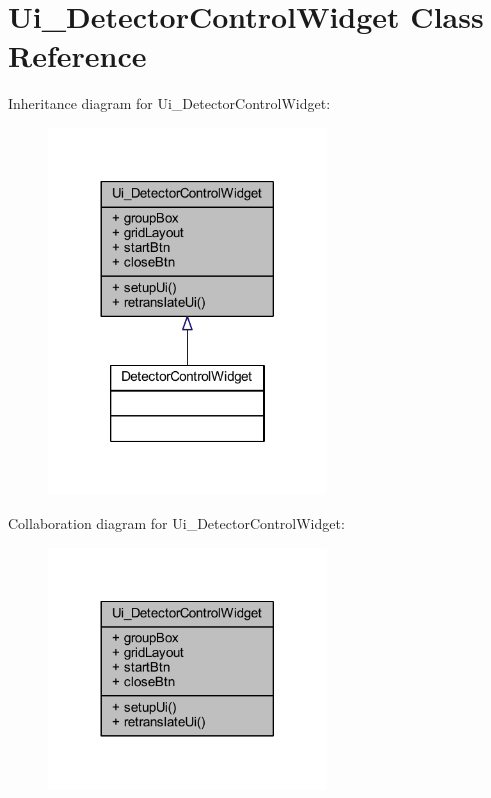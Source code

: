 \hypertarget{class_ui___detector_control_widget}{}\section{Ui\+\_\+\+Detector\+Control\+Widget Class Reference}
\label{class_ui___detector_control_widget}


Inheritance diagram for Ui\+\_\+\+Detector\+Control\+Widget\+:
\nopagebreak
\begin{figure}[H]
\begin{center}
\leavevmode
\includegraphics[width=209pt]{class_ui___detector_control_widget__inherit__graph}
\end{center}
\end{figure}


Collaboration diagram for Ui\+\_\+\+Detector\+Control\+Widget\+:
\nopagebreak
\begin{figure}[H]
\begin{center}
\leavevmode
\includegraphics[width=209pt]{class_ui___detector_control_widget__coll__graph}
\end{center}
\end{figure}
